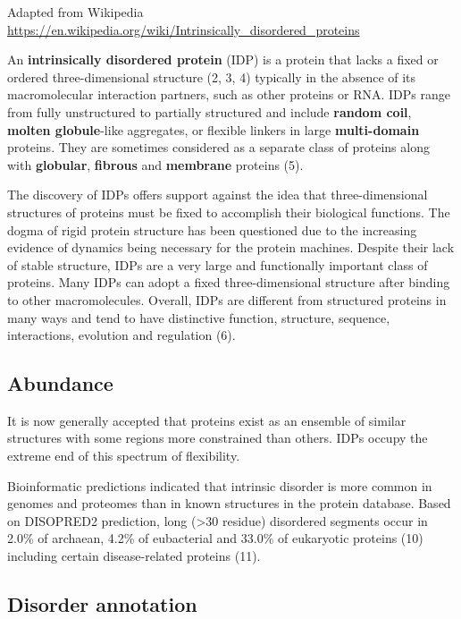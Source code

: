\documentclass[
]{book}
\begin{document}
Adapted from Wikipedia
\url{https://en.wikipedia.org/wiki/Intrinsically_disordered_proteins}

An \textbf{intrinsically disordered protein} (IDP) is a protein that lacks a fixed or ordered three-dimensional structure (2, 3, 4) typically in the absence of its macromolecular interaction partners, such as other proteins or RNA. IDPs range from fully unstructured to partially structured and include \textbf{random coil}, \textbf{molten globule}-like aggregates, or flexible linkers in large \textbf{multi-domain} proteins. They are sometimes considered as a separate class of proteins along with \textbf{globular}, \textbf{fibrous} and \textbf{membrane} proteins (5).

The discovery of IDPs offers support against the idea that three-dimensional structures of proteins must be fixed to accomplish their biological functions. The dogma of rigid protein structure has been questioned due to the increasing evidence of dynamics being necessary for the protein machines. Despite their lack of stable structure, IDPs are a very large and functionally important class of proteins. Many IDPs can adopt a fixed three-dimensional structure after binding to other macromolecules. Overall, IDPs are different from structured proteins in many ways and tend to have distinctive function, structure, sequence, interactions, evolution and regulation (6).

\hypertarget{abundance}{%
\subsection{Abundance}\label{abundance}}

It is now generally accepted that proteins exist as an ensemble of similar structures with some regions more constrained than others. IDPs occupy the extreme end of this spectrum of flexibility.

Bioinformatic predictions indicated that intrinsic disorder is more common in genomes and proteomes than in known structures in the protein database. Based on DISOPRED2 prediction, long (\textgreater30 residue) disordered segments occur in 2.0\% of archaean, 4.2\% of eubacterial and 33.0\% of eukaryotic proteins (10) including certain disease-related proteins (11).

\hypertarget{disorder-annotation}{%
\subsection{Disorder annotation}\label{disorder-annotation}}
\end{document}
